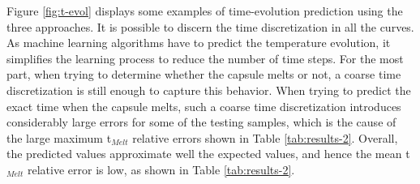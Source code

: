 Figure \ref{fig:t-evol} displays some examples of time-evolution prediction using the three approaches.
It is possible to discern the time discretization in all the curves.
As machine learning algorithms have to predict the temperature evolution, it simplifies the learning process to reduce the number of time steps.
For the most part, when trying to determine whether the capsule melts or not, a coarse time discretization is still enough to capture this behavior.
When trying to predict the exact time when the capsule melts, such a coarse time discretization introduces considerably large errors for some of the testing samples, which is the cause of the large maximum t$_{Melt}$ relative errors shown in Table \ref{tab:results-2}.  
Overall, the predicted values approximate well the expected values, and hence the mean t$_{Melt}$ relative error is low, as shown in Table \ref{tab:results-2}.

